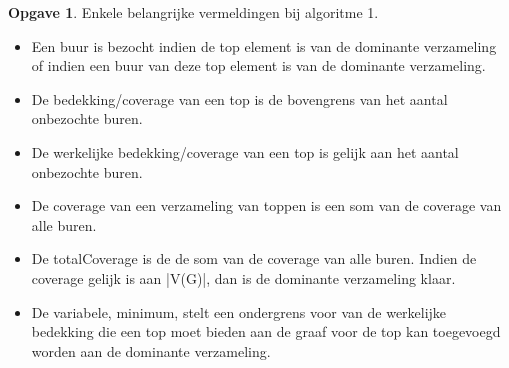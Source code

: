 \documentclass[11pt, a4paper, table]{article}
\theoremstyle{definition}
\newtheorem{opgave}{Opgave}
\begin{document}
\begin{opgave}
		Enkele belangrijke vermeldingen bij algoritme 1. 
		\begin{itemize}
		\item Een buur is bezocht indien de top element is van de dominante verzameling of indien een buur van deze top element is van de dominante verzameling.
		\item De bedekking/coverage van een top is de bovengrens van het aantal onbezochte buren.
		\item De werkelijke bedekking/coverage van een top is gelijk aan het aantal onbezochte buren. 
		\item De coverage van een verzameling van toppen is een som van de coverage van alle buren.
		\item De totalCoverage is de de som van de coverage van alle buren. Indien de coverage gelijk is aan |V(G)|, dan is de dominante verzameling klaar. 
		\item De variabele, minimum, stelt een ondergrens voor van de werkelijke bedekking die een top moet bieden aan de graaf voor de top kan toegevoegd worden aan de dominante verzameling.
		\end{itemize}
		

\end{opgave}
\end{document}
